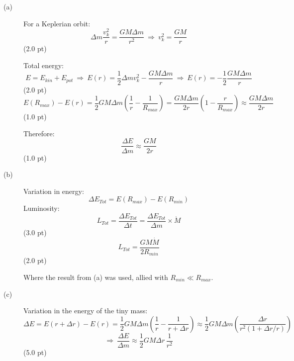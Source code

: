 \begin{description}
\item[(a)] For a Keplerian orbit:
  \[ \Delta m\frac{v_k^2}{r} = \frac{GM\Delta m}{r^2}
     \ \Rightarrow\ v_k^2 = \frac{GM}{r} \]
  \hfill(2.0 pt)

  Total energy:
  \[ E = E_{kin} + E_{pot}
     \ \Rightarrow\ E(r) = \frac{1}{2}\Delta m v_k^2 - \frac{GM\Delta m}{r}
     \ \Rightarrow\ E(r) = -\frac{1}{2}\frac{GM\Delta m}{r} \]
  \hfill(2.0 pt)
  \[ E(R_{max}) - E(r)
     = \frac{1}{2}GM\Delta m\left(\frac{1}{r} - \frac{1}{R_{max}}\right)
     = \frac{GM\Delta m}{2r}\left(1 - \frac{r}{R_{max}}\right)
     \approx \frac{GM\Delta m}{2r} \]
  \hfill(1.0 pt)

  Therefore:
  \[ \boxed{\frac{\Delta E}{\Delta m} \approx \frac{GM}{2r}} \]
  \hfill(1.0 pt)
\item[(b)] Variation in energy:
  \[ \Delta E_{Tot} = E(R_{max}) - E(R_{min}) \]
  Luminosity:
  \[ L_{Tot} = \frac{\Delta E_{Tot}}{\Delta t}
     = \frac{\Delta E_{Tot}}{\Delta m}\times\dot{M} \]
  \hfill(3.0 pt)
  \[ \boxed{L_{Tot} = \frac{GM\dot{M}}{2R_{min}}} \]
  \hfill(2.0 pt)

  Where the result from (a) was used, allied with $R_{min} \ll R_{max}$.
\item[(c)] Variation in the energy of the tiny mass:
  \[ \Delta E = E(r + \Delta r) - E(r)
     = \frac{1}{2}GM\Delta m\left(\frac{1}{r} - \frac{1}{r + \Delta r}\right)
     \approx \frac{1}{2}GM\Delta m
       \left(\frac{\Delta r}{r^2(1 + \Delta r/r)}\right) \]
  \[ \Rightarrow\ \frac{\Delta E}{\Delta m}
     \approx \frac{1}{2}GM\Delta r\,\frac{1}{r^2} \]
  \hfill(5.0 pt)


\end{description}
